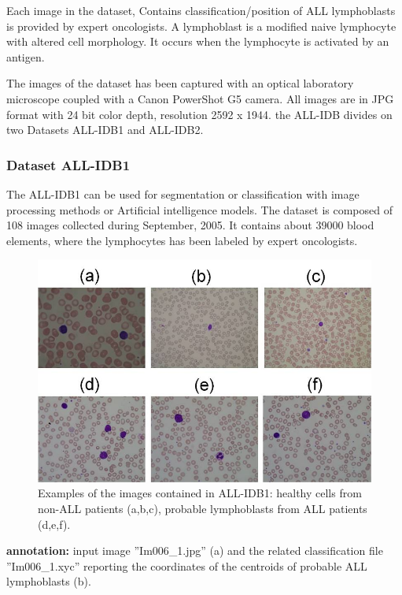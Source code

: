 Each image in the dataset, Contains classification/position of ALL lymphoblasts is provided by expert oncologists. A lymphoblast is a modified naive lymphocyte with altered cell morphology. It occurs when the lymphocyte is activated by an antigen.\

The images of the dataset has been captured with an optical laboratory microscope coupled with a Canon PowerShot G5 camera. All images are in JPG format with 24 bit color depth, resolution 2592 x 1944. the ALL-IDB divides on two Datasets ALL-IDB1 and ALL-IDB2.\

\subsubsection{Dataset ALL-IDB1}
\hspace{\parindent}
The ALL-IDB1 can be used for segmentation or classification with image processing methods or Artificial intelligence models. The dataset is composed of 108 images collected during September, 2005. It contains about 39000 blood elements, where the lymphocytes has been labeled by expert oncologists.

\begin{figure}[H]
\centering
\includegraphics[width=5.8in]{../images/ALLIDB1.jpg}
\caption{Examples of the images contained in ALL-IDB1: healthy cells from non-ALL patients (a,b,c), probable lymphoblasts from ALL patients (d,e,f). }
\end{figure}

\textbf{annotation:} input image ''Im006\_1.jpg'' (a) and the related classification file ''Im006\_1.xyc'' reporting the coordinates of the centroids of probable ALL lymphoblasts (b).

